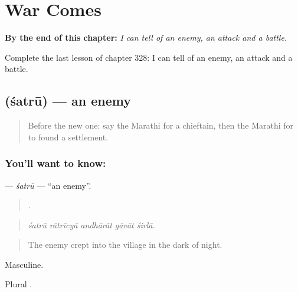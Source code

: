
\chapter{War Comes}
\label{ch:mr-war-comes}

\begin{chapteropening}
\textbf{By the end of this chapter:} \emph{I can tell of an enemy, an attack and a battle.}

Complete the last lesson of chapter 328: I can tell of an enemy, an attack and a battle.
\end{chapteropening}

\section[\texorpdfstring{\mr{शत्रू} (śatrū)}{शत्रू (śatrū)}]{ (śatrū) — an enemy}

\label{lesson:MR-C328-satru}



\begin{quote}
Before the new one: say the Marathi for a chieftain, then the Marathi for to found a settlement.
\end{quote}

\subsection*{You'll want to know: }
\textbf{} — \emph{śatrū} — \textquotedblleft{}an enemy\textquotedblright{}.

\begin{quote}
    .
\end{quote}

\begin{quote}
\emph{śatrū rātrīcyā andhārāt gāvāt śirlā.}
\end{quote}

\begin{quote}
The enemy crept into the village in the dark of night.
\end{quote}

Masculine.

Plural .

